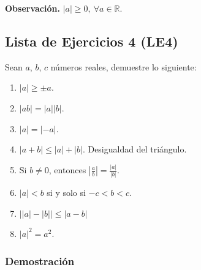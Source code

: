 \documentclass[11pt]{article}
\newcommand{\R}{\mathbb{R}}
\begin{document}
\textbf{Observación.} $|a|\geq 0, \ \forall a\in \R$.

\subsection*{Lista de Ejercicios 4 (LE4)}

Sean $a$, $b$, $c$ números reales, demuestre lo siguiente:

\begin{enumerate}[label=\alph*)]
    \item $|a| \geq \pm a$. %
    \item $|ab|=|a||b|$. %
    \item $|a|=|-a|$. %
    \item $|a+b|\leq |a|+|b|$. Desigualdad del triángulo. %
    \item Si $b\neq 0$, entonces $\left| \frac{a}{b} \right| = \frac{|a|}{|b|}$. %
    \item $|a|<b$ si y solo si $-c<b<c$. %
    \item $ \big| |a|-|b| \big| \leq |a-b|$ %
    \item $|a|^2=a^2$.
\end{enumerate}

\subsubsection*{Demostración}
\end{document}
